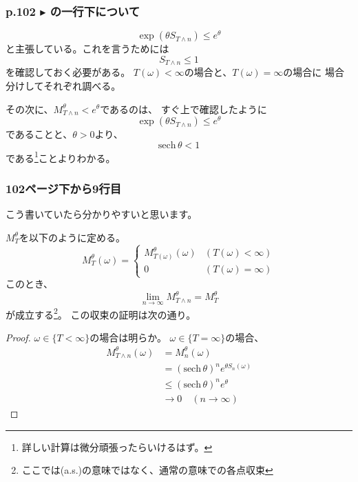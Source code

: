           \subsubsection{p.102 $\blacktriangleright$ の一行下について}
          \[
          \exp(\theta S_{T \wedge n}) \leq e^{\theta}
          \]
          と主張している。これを言うためには
          \[
          S_{T \wedge n} \leq 1
          \]
          を確認しておく必要がある。
          $T(\omega) < \infty$の場合と、$T(\omega) = \infty$の場合に
          場合分けしてそれぞれ調べる。

          その次に、$M_{T \wedge n}^{\theta} < e^{\theta}$であるのは、
          すぐ上で確認したように
          \[
          \exp(\theta S_{T \wedge n}) \leq e^{\theta}
          \]
          であることと、$\theta > 0$より、
          \[
          \text{sech} \, \theta < 1
          \]
          である\footnote{詳しい計算は微分頑張ったらいけるはず。}ことよりわかる。

      \subsubsection{102ページ下から9行目}
        こう書いていたら分かりやすいと思います。

        $M_{T}^{\theta}$を以下のように定める。
        \begin{equation*}
          M_{T}^{\theta}(\omega) =
          \begin{cases}
            M_{T(\omega)}^{\theta}(\omega) & (T(\omega) < \infty) \\
            0 & (T(\omega) = \infty)
          \end{cases}
        \end{equation*}
        このとき、
        \[
          \lim_{n \to \infty}M_{T \wedge n}^{\theta} = M_{T}^{\theta}
        \]
        が成立する\footnote{ここでは(a.s.)の意味ではなく、通常の意味での各点収束}。
        この収束の証明は次の通り。
        \begin{proof}
          $\omega \in \{ T < \infty\}$の場合は明らか。
          $\omega \in \{ T = \infty\}$の場合、
          \begin{align*}
            M_{T \wedge n}^{\theta}(\omega)
            &= M_n^{\theta}(\omega)\\
            &= (\text{sech}\, \theta)^n e^{\theta S_n(\omega)}\\
            &\leq (\text{sech}\, \theta)^n e^{\theta}\\
            & \rightarrow 0 \quad (n \rightarrow \infty)
          \end{align*}
        \end{proof}

